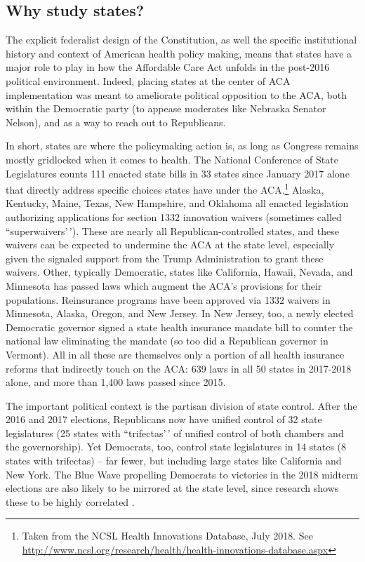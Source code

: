 \documentclass[
  oneside]{book}
\begin{document}
\hypertarget{why-study-states}{%
\subsection{Why study states?}\label{why-study-states}}

The explicit federalist design of the Constitution, as well the specific institutional history and context of American health policy making, means that states have a major role to play in how the Affordable Care Act unfolds in the post-2016 political environment. Indeed, placing states at the center of ACA implementation was meant to ameliorate political opposition to the ACA, both within the Democratic party (to appease moderates like Nebraska Senator Nelson), and as a way to reach out to Republicans.

In short, states are where the policymaking action is, as long as Congress remains mostly gridlocked when it comes to health. The National Conference of State Legislatures counts 111 enacted state bills in 33 states since January 2017 alone that directly address specific choices states have under the ACA.\footnote{Taken from the NCSL Health Innovations Database, July 2018. See \url{http://www.ncsl.org/research/health/health-innovations-database.aspx}} Alaska, Kentucky, Maine, Texas, New Hampshire, and Oklahoma all enacted legislation authorizing applications for section 1332 innovation waivers (sometimes called ``superwaivers'\,'). These are nearly all Republican-controlled states, and these waivers can be expected to undermine the ACA at the state level, especially given the signaled support from the Trump Administration to grant these waivers. Other, typically Democratic, states like California, Hawaii, Nevada, and Minnesota has passed laws which augment the ACA's provisions for their populations. Reinsurance programs have been approved via 1332 waivers in Minnesota, Alaska, Oregon, and New Jersey. In New Jersey, too, a newly elected Democratic governor signed a state health insurance mandate bill to counter the national law eliminating the mandate (so too did a Republican governor in Vermont). All in all these are themselves only a portion of all health insurance reforms that indirectly touch on the ACA: 639 laws in all 50 states in 2017-2018 alone, and more than 1,400 laws passed since 2015.

The important political context is the partisan division of state control. After the 2016 and 2017 elections, Republicans now have unified control of 32 state legislatures (25 states with ``trifectas'\,' of unified control of both chambers and the governorship). Yet Democrats, too, control state legislatures in 14 states (8 states with trifectas) -- far fewer, but including large states like California and New York. The Blue Wave propelling Democrats to victories in the 2018 midterm elections are also likely to be mirrored at the state level, since research shows these to be highly correlated \citep{Rogers:2016}.
\end{document}

